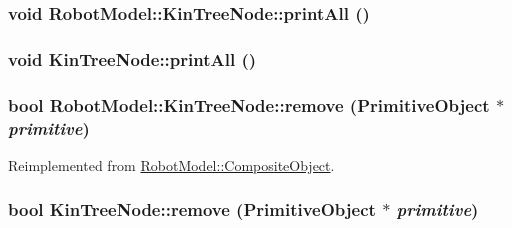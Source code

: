 \hypertarget{class_robot_model_1_1_kin_tree_node_ab3136d2833d86ee76b22066de34a562c}{
\subsubsection[{printAll}]{\setlength{\rightskip}{0pt plus 5cm}void RobotModel::KinTreeNode::printAll ()}}
\label{class_robot_model_1_1_kin_tree_node_ab3136d2833d86ee76b22066de34a562c}
\hypertarget{class_robot_model_1_1_kin_tree_node_af682a96a09f754e0fb82066560538241}{
\subsubsection[{printAll}]{\setlength{\rightskip}{0pt plus 5cm}void KinTreeNode::printAll ()}}
\label{class_robot_model_1_1_kin_tree_node_af682a96a09f754e0fb82066560538241}
\hypertarget{class_robot_model_1_1_kin_tree_node_a9612cdc54c0a34148ca5350b19a1d385}{
\subsubsection[{remove}]{\setlength{\rightskip}{0pt plus 5cm}bool RobotModel::KinTreeNode::remove ({\bf PrimitiveObject} $\ast$ {\em primitive})}}
\label{class_robot_model_1_1_kin_tree_node_a9612cdc54c0a34148ca5350b19a1d385}


Reimplemented from \hyperlink{class_robot_model_1_1_composite_object_ac63de1955b6bda820d39c01616af8665}{RobotModel::CompositeObject}.\hypertarget{class_robot_model_1_1_kin_tree_node_ac87cf9db956705dcee63f4dbc01cc664}{
\subsubsection[{remove}]{\setlength{\rightskip}{0pt plus 5cm}bool KinTreeNode::remove ({\bf PrimitiveObject} $\ast$ {\em primitive})}}
\label{class_robot_model_1_1_kin_tree_node_ac87cf9db956705dcee63f4dbc01cc664}


